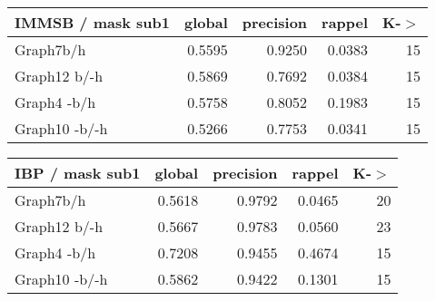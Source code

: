 \begin{table*} 
    \caption{K = 15}
	\begin{minipage}[h]{0.45\linewidth} 
\begin{tabular}{lrrrr}
\hline
 IMMSB / mask sub1   &   global &   precision &   rappel &     K-\ensuremath{>} \\
\hline
 Graph7b/h           &   0.5595 &      0.9250 &   0.0383 & 15 \\
 Graph12 b/-h        &   0.5869 &      0.7692 &   0.0384 & 15 \\
 Graph4 -b/h         &   0.5758 &      0.8052 &   0.1983 & 15 \\
 Graph10 -b/-h       &   0.5266 &      0.7753 &   0.0341 & 15 \\
\hline
\end{tabular}
\end{minipage}
\hspace{0.5cm}
\begin{minipage}[h]{0.45\linewidth}
\begin{tabular}{lrrrr}
\hline
 IBP / mask sub1   &   global &   precision &   rappel &     K-\ensuremath{>} \\
\hline
 Graph7b/h         &   0.5618 &      0.9792 &   0.0465 & 20 \\
 Graph12 b/-h      &   0.5667 &      0.9783 &   0.0560 & 23 \\
 Graph4 -b/h       &   0.7208 &      0.9455 &   0.4674 & 15 \\
 Graph10 -b/-h     &   0.5862 &      0.9422 &   0.1301 & 15 \\
\hline
\end{tabular}
\end{minipage}
\end{table*}



